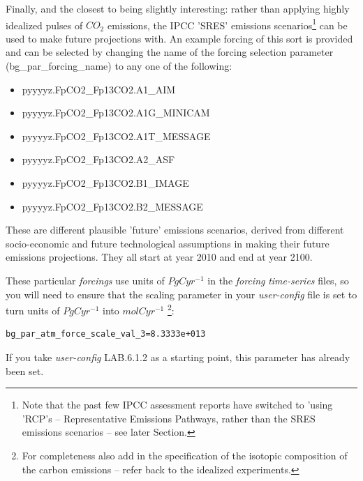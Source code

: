 \noindent Finally, and the closest to being slightly interesting: rather than applying highly idealized pulses  of \(CO_{2}\) emissions, the IPCC 'SRES' emissions scenarios\footnote{Note that the past few IPCC assessment reports have switched to 'using 'RCP's -- Representative Emissions Pathways, rather than the SRES emissions scenarios -- see later Section.}  can be used to make future projections with. An example forcing of this sort is provided and can be selected by changing the name of the forcing selection parameter (\textsf{\footnotesize bg\_par\_forcing\_name}) to any one of the following:

\vspace{1mm}\footnotesize
\begin{itemize}[noitemsep]
\item \textsf{\footnotesize pyyyyz.FpCO2\_Fp13CO2.A1\_AIM}
\item \textsf{\footnotesize pyyyyz.FpCO2\_Fp13CO2.A1G\_MINICAM}
\item \textsf{\footnotesize pyyyyz.FpCO2\_Fp13CO2.A1T\_MESSAGE}
\item \textsf{\footnotesize pyyyyz.FpCO2\_Fp13CO2.A2\_ASF}
\item \textsf{\footnotesize pyyyyz.FpCO2\_Fp13CO2.B1\_IMAGE}
\item \textsf{\footnotesize pyyyyz.FpCO2\_Fp13CO2.B2\_MESSAGE}
\end{itemize}
\normalsize\vspace{1mm}

These are different plausible 'future' emissions scenarios, derived from different socio-economic and future technological assumptions in making their future emissions projections. They all start at year 2010 and end at year 2100.

\vspace{1mm}
These particular \textit{forcings} use units of \(PgCyr^{-1}\) in the \textit{forcing} \textit{time-series} files, so you will need to ensure that the scaling parameter in your \textit{user-config} file is set to turn units of \(PgCyr^{-1}\) into \(mol C yr^{-1}\) \footnote{For completeness also add in the specification of the isotopic composition of the carbon emissions -- refer back to the idealized experiments.}:
\vspace{-1mm}\small\begin{verbatim}
bg_par_atm_force_scale_val_3=8.3333e+013
\end{verbatim}\normalsize\vspace{-1mm}
If you take \textit{user-config} \textsf{\footnotesize LAB.6.1.2} as a starting point, this parameter has already been set.


